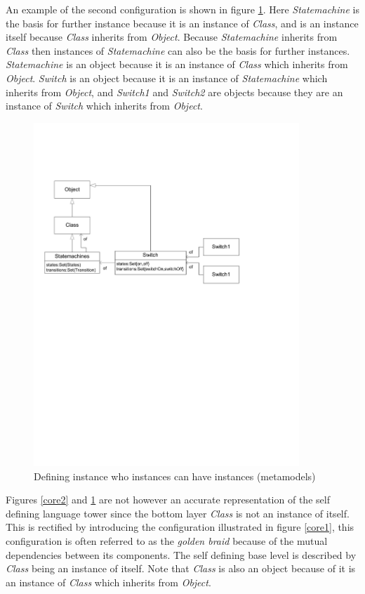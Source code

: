 An example of the second configuration is shown in figure \ref{core3}.  Here \emph{Statemachine} is the basis for further instance because it is an instance of \emph{Class}, and is an instance itself because \emph{Class} inherits from \emph{Object}.  Because \emph{Statemachine} inherits from \emph{Class} then instances of \emph{Statemachine} can also be the basis for further instances.  \emph{Statemachine} is an object because it is an instance of \emph{Class} which inherits from \emph{Object}.  \emph{Switch} is an object because it is an instance of \emph{Statemachine} which inherits from \emph{Object}, and \emph{Switch1} and \emph{Switch2} are objects because they are an instance of \emph{Switch} which inherits from \emph{Object}.

\begin{figure}[htb]
\begin{center}
\includegraphics[width=10cm]{MetaToolArchitecture/figures/core3.pdf}
\caption{Defining instance who instances can have instances (metamodels)}
\label{core3}
\end{center}
\end{figure}

Figures \ref{core2} and \ref{core3} are not however an accurate representation of the self defining language tower since the bottom layer \emph{Class} is not an instance of itself.  This is rectified by introducing the configuration illustrated in figure \ref{core1}, this configuration is often referred to as the \emph{golden braid} \cite{geb} because of the mutual dependencies between its components.  The self defining base level is described by \emph{Class} being an instance of itself.  Note that \emph{Class} is also an object because of it is an instance of \emph{Class} which inherits from \emph{Object}.


